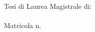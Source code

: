 \begin{titlepage}
\begin{center}
        \flushright
        \normalsize{Tesi di Laurea Magistrale di:}\\
        \medskip \spacedlowsmallcaps{\myFirstAuthorName}\\
		Matricola n. \myMatrFirstAuthor \\ 
		
		\vfill 

		\centering {\myAcademicYearIT}                     

    \end{center}  
\end{titlepage}